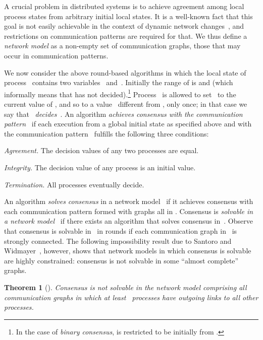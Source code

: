 \documentclass[a4paper]{article}
\theoremstyle{newthm}
\newtheorem{thm}{Theorem}
\begin{document}
A crucial problem in distributed systems is to achieve agreement among local process states
     from arbitrary initial local states.
It is a well-known fact that this goal is not easily achievable in the context 
	of dynamic network changes~\cite{FLP85,SW89}, and restrictions on communication patterns
	are required for that.
We thus define a {\em network model\/} as a non-empty set  of
     communication graphs, those that may occur in communication patterns.

We now consider the above round-based algorithms in which the local state of 
	process~ contains two variables~ and~. 
Initially the range of  is 
 	and  (which informally means that 
	has not  decided).\footnote{In the case of  {\em binary consensus\/},   is restricted to be initially from .}
Process~ is allowed to set~ to the current value of , and so to a value~ different from ,
	     only once; in that case we say that~ {\em decides}~.	
An algorithm {\em  achieves consensus with the communication pattern}~ 
	 if each execution from a global initial state as specified above and
             with the communication pattern~   fulfills the following three conditions:               
	\begin{description}
	  \item{\em Agreement.} The decision values of any two processes are equal.

	  \item{\em Integrity.} The decision value of any process is an initial value.

	  \item{\em Termination.} All processes eventually decide.

	\end{description}
An algorithm {\em  solves consensus\/} in a network
	     model~ if it achieves consensus with each communication
	     pattern formed with graphs all in .
Consensus is {\em solvable in a network model~\/} if there
     exists an algorithm that solves  consensus in~.
Observe that consensus is solvable in~ in  rounds if each communication graph 
	in~ is strongly connected. 
The following impossibility result  due to Santoro and Widmayer~\cite{SW89}, however, shows that network
     models in which consensus is solvable are highly constrained:
     consensus is not solvable in some ``almost complete'' graphs.
     
\begin{thm}[\cite{SW89}]\label{thm:SW}
Consensus is not solvable in the network model comprising all
     communication graphs in which at least~ processes have
     outgoing links to all other processes.
\end{thm}
\end{document}
